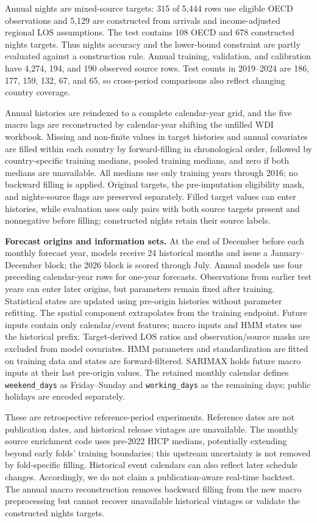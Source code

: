 \documentclass[sigconf]{acmart}
\begin{document}
Annual nights are mixed-source targets: 315 of 5,444 rows use eligible OECD observations and 5,129 are constructed from arrivals and income-adjusted regional LOS assumptions. The test contains 108 OECD and 678 constructed nights targets. Thus nights accuracy and the lower-bound constraint are partly evaluated against a construction rule. Annual training, validation, and calibration have 4,274, 194, and 190 observed source rows. Test counts in 2019--2024 are 186, 177, 159, 132, 67, and 65, so cross-period comparisons also reflect changing country coverage.

Annual histories are reindexed to a complete calendar-year grid, and the five macro lags are reconstructed by calendar-year shifting the unfilled WDI workbook. Missing and non-finite values in target histories and annual covariates are filled within each country by forward-filling in chronological order, followed by country-specific training medians, pooled training medians, and zero if both medians are unavailable. All medians use only training years through 2016; no backward filling is applied. Original targets, the pre-imputation eligibility mask, and nights-source flags are preserved separately. Filled target values can enter histories, while evaluation uses only pairs with both source targets present and nonnegative before filling; constructed nights retain their source labels.

\textbf{Forecast origins and information sets.} At the end of December before each monthly forecast year, models receive 24 historical months and issue a January--December block; the 2026 block is scored through July. Annual models use four preceding calendar-year rows for one-year forecasts. Observations from earlier test years can enter later origins, but parameters remain fixed after training. Statistical states are updated using pre-origin histories without parameter refitting. The spatial component extrapolates from the training endpoint. Future inputs contain only calendar/event features; macro inputs and HMM states use the historical prefix. Target-derived LOS ratios and observation/source masks are excluded from model covariates. HMM parameters and standardization are fitted on training data and states are forward-filtered. SARIMAX holds future macro inputs at their last pre-origin values. The retained monthly calendar defines \texttt{weekend\_days} as Friday--Sunday and \texttt{working\_days} as the remaining days; public holidays are encoded separately.

These are retrospective reference-period experiments. Reference dates are not publication dates, and historical release vintages are unavailable. The monthly source enrichment code uses pre-2022 HICP medians, potentially extending beyond early folds' training boundaries; this upstream uncertainty is not removed by fold-specific filling. Historical event calendars can also reflect later schedule changes. Accordingly, we do not claim a publication-aware real-time backtest. The annual macro reconstruction removes backward filling from the new macro preprocessing but cannot recover unavailable historical vintages or validate the constructed nights targets.
\end{document}
